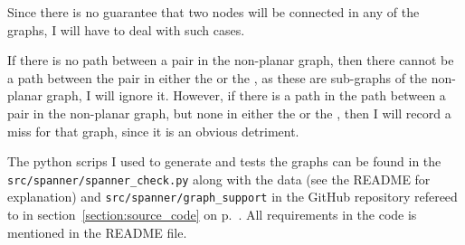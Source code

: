 Since there is no guarantee that two nodes will be connected in any of the graphs, I will have to deal with such cases.

If there is no path between a pair in the non-planar graph, then there cannot be a path between the pair in either the \gabe or the \rng, as these are sub-graphs of the non-planar graph, I will ignore it. However, if there is a path in the path between a pair in the non-planar graph, but none in either the \gabe or the \rng, then I will record a miss for that graph, since it is an obvious detriment. 

The python scrips I used to generate and tests the graphs can be found in the \texttt{src/spanner/spanner\_check.py} along with the data (see the README for explanation) and \texttt{src/spanner/graph\_support} in the GitHub repository refereed to in section~\ref{section:source_code} on p.~\pageref{section:source_code}. All requirements in the code is mentioned in the README file.
